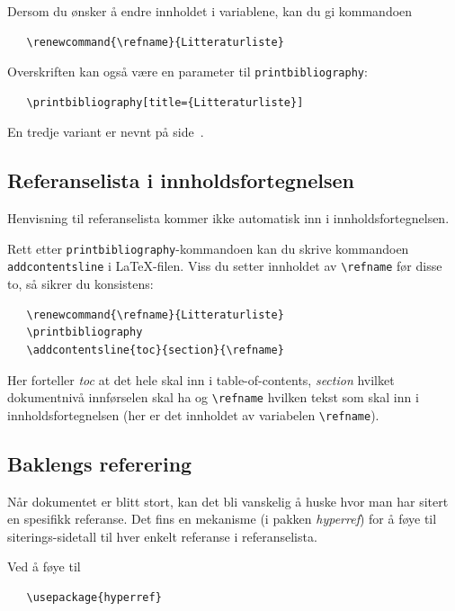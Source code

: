 \documentclass[11pt,norsk,a4paper]{article}
\newcommand{\kdo}[1]{\texttt{#1}}
\begin{document}
\noindent{}Dersom du ønsker å endre innholdet i variablene, kan du gi kommandoen

{\footnotesize\begin{verbatim}
   \renewcommand{\refname}{Litteraturliste}
\end{verbatim}}

\noindent{}Overskriften kan også være en parameter til
\kdo{printbibliography}:

{\footnotesize\begin{verbatim}
   \printbibliography[title={Litteraturliste}]
\end{verbatim}}

\noindent{}En tredje variant er nevnt på side~\pageref{heading}.

\subsection{Referanselista i innholdsfortegnelsen}\label{innhold}
Henvisning til referanselista kommer ikke automatisk inn i
innholdsfortegnelsen.  

Rett etter \texttt{printbibliography}-kommandoen kan du skrive kommandoen
\kdo{addcontentsline} i \LaTeX-filen. Viss du setter
innholdet av \verb=\refname= før disse to, så sikrer du konsistens:

{\footnotesize\begin{verbatim}
   \renewcommand{\refname}{Litteraturliste}
   \printbibliography
   \addcontentsline{toc}{section}{\refname}
\end{verbatim}}

\noindent{}Her forteller \textit{toc} at det hele skal inn i table-of-contents,
\textit{section} hvilket dokumentnivå innførselen skal ha og
\verb=\refname= hvilken tekst som skal inn i innholdsfortegnelsen
(her er det innholdet av variabelen \verb=\refname=).


\subsection{Baklengs referering} Når dokumentet er blitt stort, kan
det bli vanskelig å huske hvor man har sitert en spesifikk
referanse. Det fins en mekanisme (i pakken \textit{hyperref}) for å
føye til siterings-sidetall til hver enkelt referanse i
referanselista.

Ved å føye til

{\footnotesize\begin{verbatim}
   \usepackage{hyperref}
\end{verbatim}}
\end{document}
